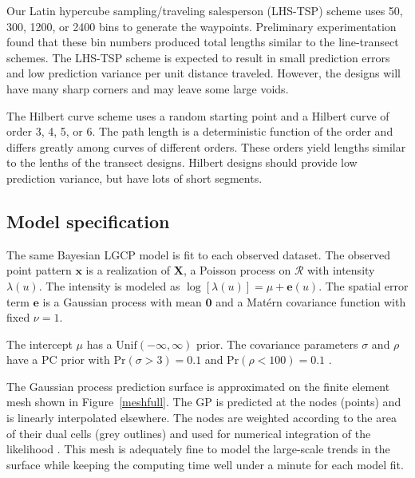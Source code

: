 \documentclass[review]{elsarticle}
\begin{document}
Our Latin hypercube sampling/traveling salesperson (LHS-TSP) scheme uses 50,
300, 1200, or 2400 bins to generate the waypoints. Preliminary experimentation
found that these bin numbers produced total lengths similar to the
line-transect schemes. The LHS-TSP scheme is expected to result in small
prediction errors and low prediction variance per unit distance traveled.
However, the designs will have many sharp corners and may leave some large
voids.

The Hilbert curve scheme uses a random starting point and a Hilbert curve of
order 3, 4, 5, or 6. The path length is a deterministic function of the order
and differs greatly among curves of different orders. These orders yield
lengths similar to the lenths of the transect designs. Hilbert designs should
provide low prediction variance, but have lots of short segments.


\subsection{Model specification}

The same Bayesian LGCP model is fit to each observed dataset. The observed
point pattern \(\mathbf{x}\) is a realization of \(\mathbf{X}\), a Poisson
process on \(\mathcal{R}\) with intensity \(\lambda(u)\). The intensity is
modeled as \(\log[\lambda(u)] = \mu + \mathbf{e}(u)\). The spatial error term
\(\mathbf{e}\) is a Gaussian process with mean \(\mathbf{0}\) and a
Mat\'{e}rn covariance function with fixed \(\nu = 1\).

The intercept \(\mu\) has a \(\mathrm{Unif}(-\infty, \infty)\) prior.
The covariance parameters \(\sigma\) and \(\rho\) have a PC prior with
\(\mathrm{Pr}(\sigma > 3) = 0.1\) and \(\mathrm{Pr}(\rho < 100) = 0.1\)
\citep{fuglstadetal,simpsonpc}.

The Gaussian process prediction surface is approximated on the finite element
mesh shown in Figure~\ref{meshfull}. The GP is predicted at the nodes (points)
and is linearly interpolated elsewhere. The nodes are weighted according to
the area of their dual cells (grey outlines) and used for numerical integration
of the likelihood \citep{lindgrenetal}. This mesh is adequately fine to model
the large-scale trends in the surface while keeping the computing time well
under a minute for each model fit.
\end{document}
